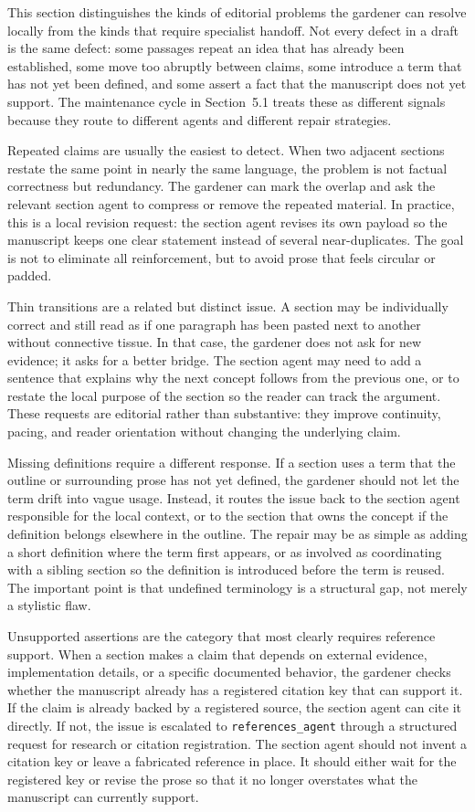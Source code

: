 This section distinguishes the kinds of editorial problems the gardener can resolve locally from the kinds that require specialist handoff. Not every defect in a draft is the same defect: some passages repeat an idea that has already been established, some move too abruptly between claims, some introduce a term that has not yet been defined, and some assert a fact that the manuscript does not yet support. The maintenance cycle in Section~5.1 treats these as different signals because they route to different agents and different repair strategies.

Repeated claims are usually the easiest to detect. When two adjacent sections restate the same point in nearly the same language, the problem is not factual correctness but redundancy. The gardener can mark the overlap and ask the relevant section agent to compress or remove the repeated material. In practice, this is a local revision request: the section agent revises its own payload so the manuscript keeps one clear statement instead of several near-duplicates. The goal is not to eliminate all reinforcement, but to avoid prose that feels circular or padded.

Thin transitions are a related but distinct issue. A section may be individually correct and still read as if one paragraph has been pasted next to another without connective tissue. In that case, the gardener does not ask for new evidence; it asks for a better bridge. The section agent may need to add a sentence that explains why the next concept follows from the previous one, or to restate the local purpose of the section so the reader can track the argument. These requests are editorial rather than substantive: they improve continuity, pacing, and reader orientation without changing the underlying claim.

Missing definitions require a different response. If a section uses a term that the outline or surrounding prose has not yet defined, the gardener should not let the term drift into vague usage. Instead, it routes the issue back to the section agent responsible for the local context, or to the section that owns the concept if the definition belongs elsewhere in the outline. The repair may be as simple as adding a short definition where the term first appears, or as involved as coordinating with a sibling section so the definition is introduced before the term is reused. The important point is that undefined terminology is a structural gap, not merely a stylistic flaw.

Unsupported assertions are the category that most clearly requires reference support. When a section makes a claim that depends on external evidence, implementation details, or a specific documented behavior, the gardener checks whether the manuscript already has a registered citation key that can support it. If the claim is already backed by a registered source, the section agent can cite it directly. If not, the issue is escalated to \texttt{references\_agent} through a structured request for research or citation registration. The section agent should not invent a citation key or leave a fabricated reference in place. It should either wait for the registered key or revise the prose so that it no longer overstates what the manuscript can currently support.

